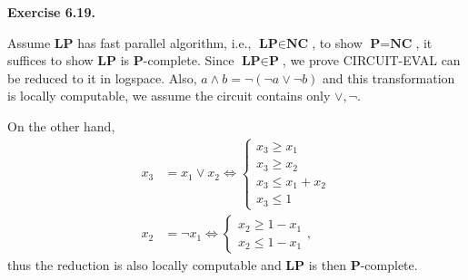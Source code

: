 \documentclass[a4paper]{article}
\newenvironment{exercise}[1]{
	\par
	\noindent\textbf{Exercise #1.}\quad
}{
	\par
	\bigskip
}
\begin{document}
\begin{exercise}{6.19}
    Assume \textbf{LP} has fast parallel algorithm, i.e., 
    $\textbf{LP}\in\textbf{NC}$, to show $\textbf{P}=\textbf{NC}$, it suffices
    to show \textbf{LP} is $\textbf{P}$-complete. Since $\textbf{LP}\in\textbf{P}$, we prove CIRCUIT-EVAL can be
    reduced to it in logspace. Also, $a\land b=\neg(\neg a\lor\neg b)$ and this transformation is locally computable,
    we assume the circuit contains only $\lor,\neg$.

    On the other hand,
    \begin{align*}
        x_3&=x_1\lor x_2\iff\begin{cases}
            x_3\geq x_1\\
            x_3\geq x_2\\
            x_3\leq x_1+x_2\\
            x_3\leq 1
        \end{cases}\\
        x_2&=\neg x_1\iff\begin{cases}
            x_2\geq 1-x_1\\
            x_2\leq 1-x_1
        \end{cases},
    \end{align*}
    thus the reduction is also locally computable and \textbf{LP} is then \textbf{P}-complete.
\end{exercise}
\end{document}
